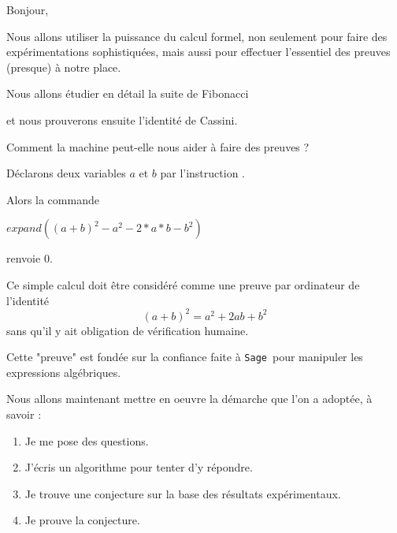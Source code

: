 


\newcommand{\Sage}{\texttt{Sage}}





\debuttexte


\diapo

Bonjour,

Nous allons utiliser la puissance du calcul formel, non seulement pour faire des expérimentations sophistiquées, mais aussi pour effectuer l'essentiel des preuves (presque) à notre place.


\change

\change
Nous allons étudier en détail la suite de Fibonacci

\change
et nous prouverons ensuite l'identité de Cassini.

\diapo

Comment la machine peut-elle nous aider à faire des preuves ?

\change
Déclarons deux variables $a$ et $b$
par l'instruction .

\change
Alors la commande

$expand( (a+b)^2-a^2-2*a*b-b^2 )$

renvoie $0$.

\change
Ce simple calcul doit être considéré comme une preuve par ordinateur
de l'identité 
$$(a+b)^2 = a^2+2ab+b^2$$
sans qu'il y ait obligation de vérification humaine.

\change
Cette "preuve" est fondée sur la confiance faite à \Sage\ 
pour manipuler les expressions algébriques.

\change
Nous allons maintenant mettre en oeuvre la démarche 
que l'on a adoptée, à savoir :

\change
\begin{enumerate}
  \item Je me pose des questions.

  \change
  \item J'écris un algorithme pour tenter d'y répondre.

  \change
  \item Je trouve une conjecture sur la base des résultats expérimentaux.

  \change
  \item Je prouve la conjecture.
\end{enumerate}


